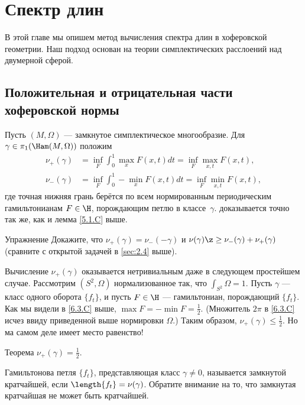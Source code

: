\chapter{Спектр длин}

В этой главе мы опишем метод вычисления спектра длин в хоферовской геометрии.
Наш подход основан на теории симплектических расслоений над двумерной сферой.

\section{Положительная и отрицательная части хоферовской нормы}

Пусть $(M, \Omega)$ --- замкнутое симплектическое многообразие.
Для $\gamma \in \pi_1 (\Ham(M, \Omega))$ положим 
\begin{align*}
\nu_+ (\gamma) &= \inf_F \int_0^1 \max_x F (x, t)dt = \inf_F \max_{x,t}F (x, t),
\\ 
\nu_- (\gamma) &= \inf_F \int_0^1 -\min_x F (x, t)dt = \inf_F \min_{x,t}F (x, t),
\end{align*}
где точная нижняя грань берётся по всем нормированным периодическим гамильтонианам $F \in \H$, порождающим петлю в классе~$\gamma$.
 доказывается точно так же, как и лемма \ref{5.1.C} выше.

\begin{thm}{Упражнение}
Докажите, что $\nu_+ (\gamma) = \nu_- (-\gamma)$ и $\nu(\gamma) \z\ge \nu_- (\gamma) + \nu_+ (\gamma)$
(сравните с открытой задачей в \ref{sec:2.4} выше).
\end{thm}

Вычисление $\nu_+ (\gamma)$ оказывается нетривиальным даже в следующем простейшем случае.
Рассмотрим $(S^2, \Omega)$ нормализованное так, что $\int_{S^2} \Omega = 1$.
Пусть $\gamma$ --- класс одного оборота $\{f_t\}$, и пусть $F \in \H$ --- гамильтониан, порождающий $\{f_t\}$.
Как мы видели в \ref{6.3.C} выше,  $\max F = - \min F = \frac12$.
(Множитель $2\pi$ в \ref{6.3.C} исчез ввиду приведенной выше нормировки $\Omega$.)
Таким образом, $\nu_+ (\gamma) \le \frac12$.
Но ма самом деле имеет место равенство!

\begin{thm}{Теорема}\label{9.1.A}
$\nu_+ (\gamma) = \frac12$.
\end{thm}

Гамильтонова петля $\{f_t \}$, представляющая класс $\gamma \ne 0$, называется замкнутой кратчайшей, если $\length\{f_t \} = \nu(\gamma)$.
Обратите внимание на то, что замкнутая кратчайшая не может быть кратчайшей.


